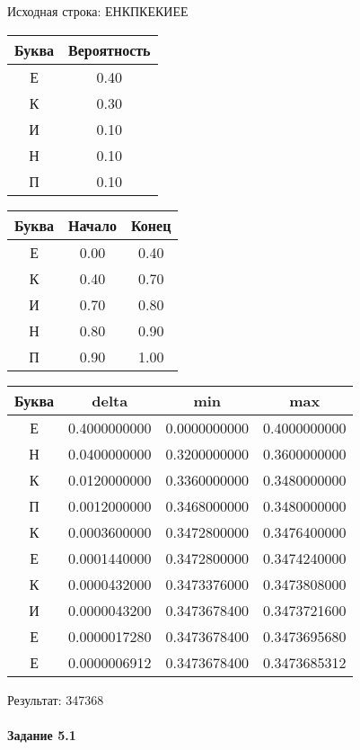 \documentclass[a4paper, 12pt]{article}
\begin{document}
Исходная строка: ЕНКПКЕКИЕЕ\
\begin{center}
 \begin{tabular}{ |c|c| } 
  \hline
     Буква & Вероятность \\ \hline
Е & 0.40\\\hline
К & 0.30\\\hline
И & 0.10\\\hline
Н & 0.10\\\hline
П & 0.10
\\ \hline \end{tabular}
\end{center}
\begin{center}
 \begin{tabular}{ |c|c|c| } 
  \hline
     Буква & Начало & Конец \\ \hline
Е & 0.00 & 0.40\\\hline
К & 0.40 & 0.70\\\hline
И & 0.70 & 0.80\\\hline
Н & 0.80 & 0.90\\\hline
П & 0.90 & 1.00
\\ \hline \end{tabular}
\end{center}
\begin{center}
 \begin{tabular}{ |c|c|c|c| } 
  \hline
     Буква & delta & min & max \\ \hline
Е & 0.4000000000 & 0.0000000000 & 0.4000000000\\\hline
Н & 0.0400000000 & 0.3200000000 & 0.3600000000\\\hline
К & 0.0120000000 & 0.3360000000 & 0.3480000000\\\hline
П & 0.0012000000 & 0.3468000000 & 0.3480000000\\\hline
К & 0.0003600000 & 0.3472800000 & 0.3476400000\\\hline
Е & 0.0001440000 & 0.3472800000 & 0.3474240000\\\hline
К & 0.0000432000 & 0.3473376000 & 0.3473808000\\\hline
И & 0.0000043200 & 0.3473678400 & 0.3473721600\\\hline
Е & 0.0000017280 & 0.3473678400 & 0.3473695680\\\hline
Е & 0.0000006912 & 0.3473678400 & 0.3473685312
\\ \hline \end{tabular}
\end{center}
Результат: 347368
\pagebreak
\paragraph{Задание 5.1}
\end{document}
